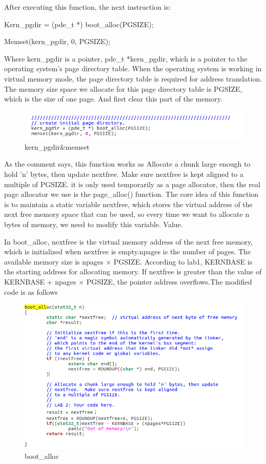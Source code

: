 After executing this function, the next instruction is:

Kern\_pgdir = (pde\_t *) boot\_alloc(PGSIZE);

Memset(kern\_pgdir, 0, PGSIZE);

Where kern\_pgdir is a pointer, pde\_t *kern\_pgdir, which is a pointer to the operating system's page directory table. When the operating system is working in virtual memory mode, the page directory table is required for address translation. The memory size space we allocate for this page directory table is PGSIZE, which is the size of one page. And first clear this part of the memory.
\begin{figure}[H]
\centering
\includegraphics[width=0.8\linewidth]{figure/kern_pgdir}
\caption{kern\_pgdir\&memset}
\end{figure}


As the comment says, this function works as Allocate a chunk large enough to hold 'n' bytes, then update nextfree. Make sure nextfree is kept aligned to a multiple of PGSIZE. it is only used temporarily as a page allocator, then the real page allocator we use is the page\_alloc() function. The core idea of ​​this function is to maintain a static variable nextfree, which stores the virtual address of the next free memory space that can be used, so every time we want to allocate n bytes of memory, we need to modify this variable. Value.


In boot\_alloc, nextfree is the virtual memory address of the next free memory, which is initialized when nextfree is empty.npages is the number of pages. The available memory size is npages × PGSIZE. According to lab1, KERNBASE is the starting address for allocating memory. If nextfree is greater than the value of KERNBASE + npages × PGSIZE, the pointer address overflows.The modified code is as follows

\begin{figure}[H]
\centering
\includegraphics[width=0.8\linewidth]{figure/changed_boot_alloc}
\caption{boot\_alloc}
\end{figure}


